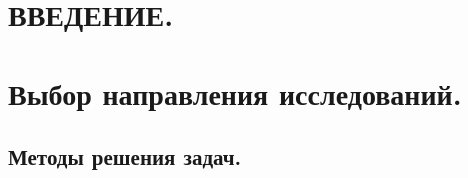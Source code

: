 \section*{ВВЕДЕНИЕ.} %

\section{Выбор направления исследований.} %

\subsection{Методы решения задач.} %
